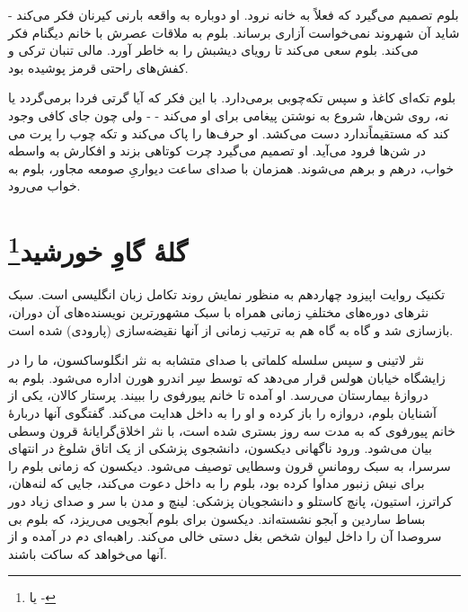 \documentclass[12pt]{book}
\begin{document}
    بلوم تصمیم می‌گیرد که فعلاً به خانه نرود. او دوباره به واقعه بارنی کیرنان فکر می‌کند - شاید آن شهروند نمی‌خواست آزاری برساند. بلوم به ملاقات عصرش با خانم دیگنام فکر می‌کند. بلوم سعی می‌کند تا رویای دیشبش را به خاطر آورد. مالی تنبان ترکی و کفش‌های راحتی قرمز پوشیده بود.

    بلوم تکه‌ای کاغذ و سپس تکه‌چوبی برمی‌دارد. با این فکر که آیا گرتی فردا برمی‌گردد یا نه، روی شن‌ها، شروع به نوشتن پیغامی برای او می‌کند -  - ولی چون جای کافی وجود ندارد دست می‌کشد. او حرف‌ها را پاک می‌کند و تکه چوب را پرت می‎‌کند که مستقیماً در شن‌ها فرود می‌آید. او تصمیم می‌گیرد چرت کوتاهی بزند و افکارش به واسطه خواب، درهم و برهم می‌شوند. همزمان با صدای ساعت دیواریِ صومعه مجاور، بلوم به خواب می‌رود.

    \chapter[گلۀ گاوِ خورشید]{گلۀ گاوِ خورشید\protect\footnote{ یا -}}\label{ep:14}
    تکنیک روایت اپیزود چهاردهم به منظور نمایش روند تکامل زبان انگلیسی است. سبک نثر‌های دوره‌های مختلفِ زمانی همراه با سبک مشهورترین نویسنده‌های آن دوران، بازسازی شد و گاه به گاه هم به ترتیب زمانی از آنها نقیضه‌سازی (پارودی) شده است.

    نثر لاتینی و سپس سلسله کلماتی با صدای متشابه به نثر انگلوساکسون، ما را در زایشگاه خیابان هولس قرار می‌دهد که توسط سِر اندرو هورن اداره می‌شود. بلوم به دروازۀ بیمارستان می‌رسد. او آمده تا خانم پیورفوی را ببیند. پرستار کالان، یکی از آشنایان بلوم، دروازه را باز کرده و او را به داخل هدایت می‌کند. گفتگوی آنها دربارۀ خانم پیورفوی که به مدت سه روز بستری شده است، با نثر اخلاق‌گرایانۀ قرون وسطی بیان می‌شود. ورود ناگهانی دیکسون، دانشجوی پزشکی از یک اتاق شلوغ در انتهای سرسرا، به سبک رومانسِ قرون وسطایی توصیف می‌شود. دیکسون که زمانی بلوم را برای نیش زنبور مداوا کرده بود، بلوم را به داخل دعوت می‌کند، جایی که لنه‌هان، کراترز، استیون، پانچ کاستلو و دانشجویان پزشکی: لینچ و مدن با سر و صدای زیاد دور بساط ساردین و آبجو نشسته‌اند. دیکسون برای بلوم آبجویی می‌ریزد، که بلوم بی سروصدا آن را داخل لیوان شخص بغل دستی خالی می‌کند. راهبه‌ای دم در آمده و از آنها می‌خواهد که ساکت باشند.
\end{document}
